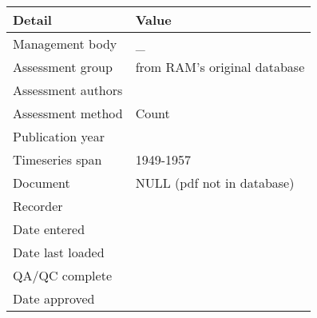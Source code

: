 \begin{table}[htb]
\centering
\begin{tabular}{ll}
\toprule
Detail & Value \\
\midrule
Management body    & \_                           \\
Assessment group   & from RAM's original database \\
Assessment authors &                              \\
Assessment method  & Count                        \\
Publication year   &                              \\
Timeseries span    & 1949-1957                    \\
Document           & NULL (pdf not in database)   \\
Recorder           &                              \\
Date entered       &                              \\
Date last loaded   &                              \\
QA/QC complete     &                              \\
Date approved      &                              \\
\bottomrule
\end{tabular}
\label{tab:assessdet}
\end{table}

